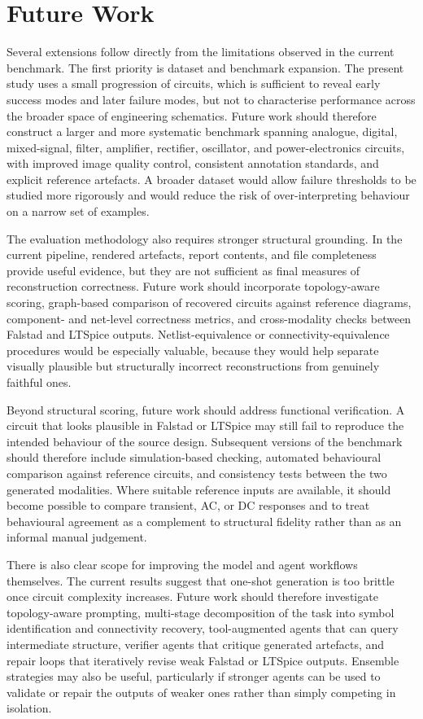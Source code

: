 \section{Future Work}

Several extensions follow directly from the limitations observed in the current benchmark. The first priority is dataset and benchmark expansion. The present study uses a small progression of circuits, which is sufficient to reveal early success modes and later failure modes, but not to characterise performance across the broader space of engineering schematics. Future work should therefore construct a larger and more systematic benchmark spanning analogue, digital, mixed-signal, filter, amplifier, rectifier, oscillator, and power-electronics circuits, with improved image quality control, consistent annotation standards, and explicit reference artefacts. A broader dataset would allow failure thresholds to be studied more rigorously and would reduce the risk of over-interpreting behaviour on a narrow set of examples.

The evaluation methodology also requires stronger structural grounding. In the current pipeline, rendered artefacts, report contents, and file completeness provide useful evidence, but they are not sufficient as final measures of reconstruction correctness. Future work should incorporate topology-aware scoring, graph-based comparison of recovered circuits against reference diagrams, component- and net-level correctness metrics, and cross-modality checks between Falstad and LTSpice outputs. Netlist-equivalence or connectivity-equivalence procedures would be especially valuable, because they would help separate visually plausible but structurally incorrect reconstructions from genuinely faithful ones.

Beyond structural scoring, future work should address functional verification. A circuit that looks plausible in Falstad or LTSpice may still fail to reproduce the intended behaviour of the source design. Subsequent versions of the benchmark should therefore include simulation-based checking, automated behavioural comparison against reference circuits, and consistency tests between the two generated modalities. Where suitable reference inputs are available, it should become possible to compare transient, AC, or DC responses and to treat behavioural agreement as a complement to structural fidelity rather than as an informal manual judgement.

There is also clear scope for improving the model and agent workflows themselves. The current results suggest that one-shot generation is too brittle once circuit complexity increases. Future work should therefore investigate topology-aware prompting, multi-stage decomposition of the task into symbol identification and connectivity recovery, tool-augmented agents that can query intermediate structure, verifier agents that critique generated artefacts, and repair loops that iteratively revise weak Falstad or LTSpice outputs. Ensemble strategies may also be useful, particularly if stronger agents can be used to validate or repair the outputs of weaker ones rather than simply competing in isolation.

